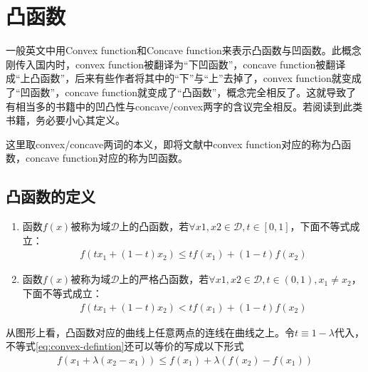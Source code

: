 \chapter{凸函数}
\label{chap:convex-functions}

一般英文中用Convex function和Concave function来表示凸函数与凹函数。此概念刚传入国内时，convex function被翻译为“下凹函数”，concave function被翻译成“上凸函数”，后来有些作者将其中的“下”与“上”去掉了，convex function就变成了“凹函数”，concave function就变成了“凸函数”，概念完全相反了。这就导致了有相当多的书籍中的凹凸性与concave/convex两字的含议完全相反。若阅读到此类书籍，务必要小心其定义。


这里取convex/concave两词的本义，即将文献中convex function对应的称为凸函数，concave function对应的称为凹函数。

\section{凸函数的定义}
\label{sec:definition-of-convexity}

\begin{definition}\mbox{}\par
  \begin{enumerate}
  \item 函数$f(x)$被称为域$\mathcal{D}$上的凸函数，若$\forall x1,x2\in\mathcal{D}, t\in[0,1]$，下面不等式成立：
    \begin{align}\label{eq:convex-defintion}
      f\left(tx_1+(1-t)x_2\right)\le tf(x_1) + (1-t)f(x_2)
    \end{align}
  \item 函数$f(x)$被称为域$\mathcal{D}$上的严格凸函数，若$\forall x1,x2\in\mathcal{D}, t\in(0,1),x_1\ne x_2$，下面不等式成立：
    \begin{align}
      f\left(tx_1+(1-t)x_2\right)< tf(x_1) + (1-t)f(x_2)
    \end{align}
  \end{enumerate}
\end{definition}

从图形上看，凸函数对应的曲线上任意两点的连线在曲线之上。令$t\equiv 1-\lambda$代入，不等式\ref{eq:convex-defintion}还可以等价的写成以下形式
\begin{align*}
  f\left(x_1+\lambda(x_2-x_1)\right)\le f(x_1) + \lambda \left(f(x_2)-f(x_1)\right)
\end{align*}


